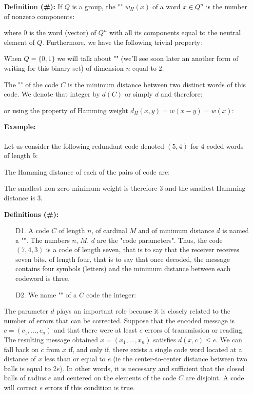 	\textbf{Definition (\#\mydef):} If $Q$ is a group, the "" $w_H(x)$ of a word $x\in Q^n$ is the number of nonzero components:
	
	where $0$ is the word (vector) of $Q^n$ with all its components equal to the neutral element of $Q$. Furthermore, we have the following trivial property:
	
	\begin{tcolorbox}[title=Remark,colframe=black,arc=10pt]
	When $Q=\{0,1\}$ we will talk about "" (we'll see soon later an another form of writing for this binary set) of dimension $n$ equal to $2$.
	\end{tcolorbox}
	The "" of the code $C$ is the minimum distance between two distinct words of this code. We denote that integer by $d(C)$ or simply $d$ and therefore:
	
	or using the property of Hamming weight $d_H(x,y)=w(x-y)=w(x)$:
	
	\begin{tcolorbox}[colframe=black,colback=white,sharp corners]
	\textbf{{\Large {}}Example:}\\\\
	Let us consider the following redundant code denoted $(5, 4)$ for $4$ coded words of length $5$:
	
	The Hamming distance of each of the pairs of code are:
	
	The smallest non-zero minimum weight is therefore $3$ and the smallest Hamming distance is $3$.
	\end{tcolorbox}
	
	\pagebreak
	\textbf{Definitions (\#\mydef):}
	\begin{itemize}
		\item[D1.] A code $C$ of length $n$, of cardinal $M$ and of minimum distance $d$ is named a "". The numbers $n$, $M$, $d$ are the "code parameters". Thus, the code $(7, 4, 3)$ is a code of length seven, that is to say that the receiver receives seven bits, of length four, that is to say that once decoded, the message contains four symbols (letters) and the minimum distance between each codeword is three.

		\item[D2.] We name "" of a $C$ code the integer:
		
	\end{itemize}
	The parameter $d$ plays an important role because it is closely related to the number of errors that can be corrected. Suppose that the encoded message is $c=(c_1,\ldots,c_n)$ and that there were at least $e$ errors of transmission or reading. The resulting message obtained $x=(x_1,\ldots,x_n)$ satisfies $d(x,c)\le e$. We can fall back on $c$ from $x$ if, and only if, there exists a single code word located at a distance of $x$ less than or equal to $e$ (ie the center-to-center distance between two balls is equal to $2e$). In other words, it is necessary and sufficient that the closed balls of radius $e$ and centered on the elements of the code $C$ are disjoint. A code will correct $e$ errors if this condition is true.

